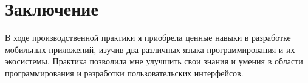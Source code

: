 \section*{Заключение}
В ходе производственной практики я приобрела ценные навыки в разработке мобильных приложений, изучив два различных языка программирования и их экосистемы. Практика позволила мне улучшить свои знания и умения в области программирования и разработки пользовательских интерфейсов.

